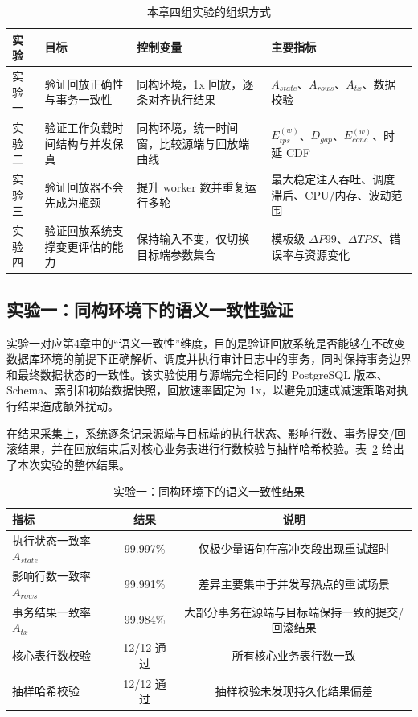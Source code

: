 \begin{table}[htbp]
    \centering
    \caption{本章四组实验的组织方式}
    \label{tab:chapter5_exp_overview}
    \begin{tabular}{p{1.8cm}p{3.2cm}p{4.5cm}p{4.0cm}}
        \toprule
        \textbf{实验} & \textbf{目标} & \textbf{控制变量} & \textbf{主要指标} \\
        \midrule
        实验一 & 验证回放正确性与事务一致性 & 同构环境，1x 回放，逐条对齐执行结果 & $A_{state}$、$A_{rows}$、$A_{tx}$、数据校验 \\
        实验二 & 验证工作负载时间结构与并发保真 & 同构环境，统一时间窗，比较源端与回放端曲线 & $E_{tps}^{(w)}$、$D_{gap}$、$E_{conc}^{(w)}$、时延 CDF \\
        实验三 & 验证回放器不会先成为瓶颈 & 提升 worker 数并重复运行多轮 & 最大稳定注入吞吐、调度滞后、CPU/内存、波动范围 \\
        实验四 & 验证回放系统支撑变更评估的能力 & 保持输入不变，仅切换目标端参数集合 & 模板级 $\Delta P99$、$\Delta TPS$、错误率与资源变化 \\
        \bottomrule
    \end{tabular}
\end{table}

\subsection{实验一：同构环境下的语义一致性验证}
实验一对应第4章中的“语义一致性”维度，目的是验证回放系统是否能够在不改变数据库环境的前提下正确解析、调度并执行审计日志中的事务，同时保持事务边界和最终数据状态的一致性。该实验使用与源端完全相同的 PostgreSQL 版本、Schema、索引和初始数据快照，回放速率固定为 1x，以避免加速或减速策略对执行结果造成额外扰动。

在结果采集上，系统逐条记录源端与目标端的执行状态、影响行数、事务提交/回滚结果，并在回放结束后对核心业务表进行行数校验与抽样哈希校验。表~\ref{tab:semantic_result} 给出了本次实验的整体结果。

\begin{table}[htbp]
    \centering
    \caption{实验一：同构环境下的语义一致性结果}
    \label{tab:semantic_result}
    \begin{tabular}{lcc}
        \toprule
        \textbf{指标} & \textbf{结果} & \textbf{说明} \\
        \midrule
        执行状态一致率 $A_{state}$ & 99.997\% & 仅极少量语句在高冲突段出现重试超时 \\
        影响行数一致率 $A_{rows}$ & 99.991\% & 差异主要集中于并发写热点的重试场景 \\
        事务结果一致率 $A_{tx}$ & 99.984\% & 大部分事务在源端与目标端保持一致的提交/回滚结果 \\
        核心表行数校验 & 12/12 通过 & 所有核心业务表行数一致 \\
        抽样哈希校验 & 12/12 通过 & 抽样校验未发现持久化结果偏差 \\
        \bottomrule
    \end{tabular}
\end{table}

